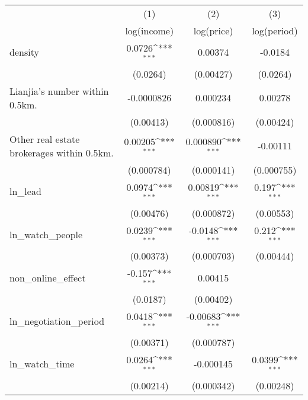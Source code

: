 {
\def\sym#1{\ifmmode^{#1}\else\(^{#1}\)\fi}
\begin{tabular}{l*{3}{c}}
\toprule
                    &\multicolumn{1}{c}{(1)}&\multicolumn{1}{c}{(2)}&\multicolumn{1}{c}{(3)}\\
                    &\multicolumn{1}{c}{log(income)}&\multicolumn{1}{c}{log(price)}&\multicolumn{1}{c}{log(period)}\\
\midrule
density             &      0.0726\sym{***}&     0.00374         &     -0.0184         \\
                    &    (0.0264)         &   (0.00427)         &    (0.0264)         \\
\addlinespace
Lianjia's number within 0.5km.&  -0.0000826         &    0.000234         &     0.00278         \\
                    &   (0.00413)         &  (0.000816)         &   (0.00424)         \\
\addlinespace
Other real estate brokerages within 0.5km.&     0.00205\sym{***}&    0.000890\sym{***}&    -0.00111         \\
                    &  (0.000784)         &  (0.000141)         &  (0.000755)         \\
\addlinespace
ln\_lead             &      0.0974\sym{***}&     0.00819\sym{***}&       0.197\sym{***}\\
                    &   (0.00476)         &  (0.000872)         &   (0.00553)         \\
\addlinespace
ln\_watch\_people     &      0.0239\sym{***}&     -0.0148\sym{***}&       0.212\sym{***}\\
                    &   (0.00373)         &  (0.000703)         &   (0.00444)         \\
\addlinespace
non\_online\_effect   &      -0.157\sym{***}&     0.00415         &                     \\
                    &    (0.0187)         &   (0.00402)         &                     \\
\addlinespace
ln\_negotiation\_period&      0.0418\sym{***}&    -0.00683\sym{***}&                     \\
                    &   (0.00371)         &  (0.000787)         &                     \\
\addlinespace
ln\_watch\_time       &      0.0264\sym{***}&   -0.000145         &      0.0399\sym{***}\\
                    &   (0.00214)         &  (0.000342)         &   (0.00248)         \\

\end{tabular}}
